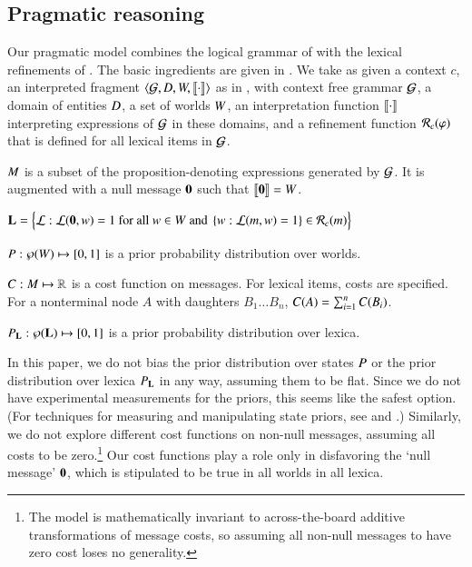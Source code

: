 \documentclass[leqno,12pt]{article}
\begin{document}

\subsection{Pragmatic reasoning}\label{sec:agents}

Our pragmatic model combines the logical grammar of
 with the lexical refinements of
. The basic ingredients are given in
. We take as given a context $c$, an interpreted
fragment $\langle \mathcal{G}, D, W, \llbracket\cdot\rrbracket \rangle$ as in
, with context free grammar $\mathcal{G}$, a domain
of entities $D$, a set of worlds $W$, an interpretation
function $\llbracket\cdot\rrbracket$ interpreting expressions of $\mathcal{G}$ in these
domains, and a refinement function $\mathcal{R}_{c}(\varphi)$ that is defined
for all lexical items in $\mathcal{G}$.
%
\begin{examples}
\item\label{modobjects}
  \begin{examples}
  \item\label{messages} $M$ is a subset of the
    proposition-denoting expressions generated by $\mathcal{G}$. It is
    augmented with a null message $\mathbf{0}$ such that
    $\llbracket\mathbf{0}\rrbracket = W$.

  \item\label{lexset}%
    $\mathbf{L} = \Big\{ \mathcal{L} : \mathcal{L}(\mathbf{0}, w)=1 \text{ for all } w \in W \text{ and } \left\{ w : \mathcal{L}(m, w)=1 \right\} \in \mathcal{R}_{c}(m) \Big\}$             
  
  \item $P : \wp(W) \mapsto [0,1]$ is a prior probability
    distribution over worlds.

  \item $C : M \mapsto \mathbb{R}$ is a cost function on
    messages.  For lexical items, costs are specified. For a
    nonterminal node $A$ with daughters $B_{1} \ldots B_{n}$,
    $C(A) = \sum_{i=1}^{n}C(B_{i})$.

  \item $P_{\mathbf{L}} : \wp(\mathbf{L}) \mapsto [0,1]$ is a prior probability
    distribution over lexica.
  \end{examples}
\end{examples}

In this paper, we do not bias the prior distribution over states
$P$ or the prior distribution over lexica $P_{\mathbf{L}}$ in any
way, assuming them to be flat. Since we do not have experimental
measurements for the priors, this seems like the safest option. (For
techniques for measuring and manipulating state priors, see
\citealt{Frank:Goodman:2012} and
\citealt{Stiller:Goodman:Frank:2011}.)  Similarly, we do not explore
different cost functions on non-null messages, assuming all costs to
be zero.\footnote{The model is mathematically invariant to
  across-the-board additive transformations of message costs, so
  assuming all non-null messages to have zero cost loses no
  generality.} Our cost functions play a role only in disfavoring the
`null message' $\mathbf{0}$, which is stipulated to be true in all
worlds in all lexica.
\end{document}
